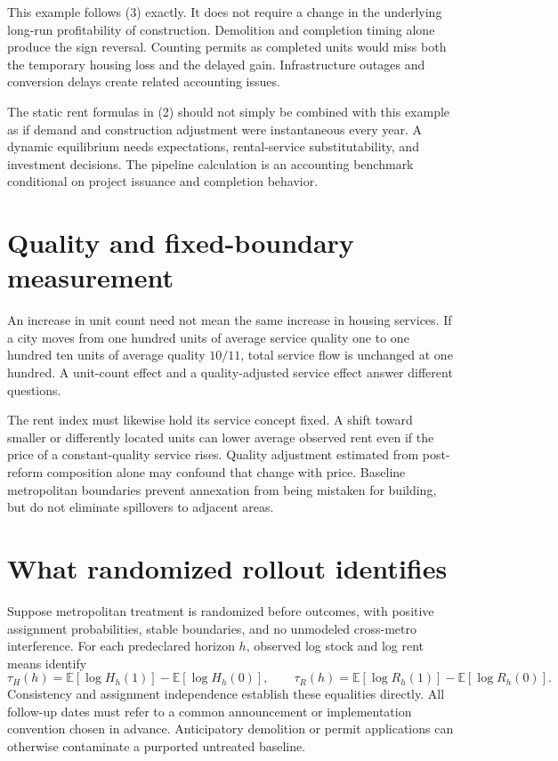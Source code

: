 \documentclass[11pt,a4paper]{article}
\newcommand{\E}{\mathbb E}
\begin{document}
This example follows (3) exactly. It does not require a change in the underlying long-run profitability of construction. Demolition and completion timing alone produce the sign reversal. Counting permits as completed units would miss both the temporary housing loss and the delayed gain. Infrastructure outages and conversion delays create related accounting issues.

The static rent formulas in (2) should not simply be combined with this example as if demand and construction adjustment were instantaneous every year. A dynamic equilibrium needs expectations, rental-service substitutability, and investment decisions. The pipeline calculation is an accounting benchmark conditional on project issuance and completion behavior.
\section{Quality and fixed-boundary measurement}
An increase in unit count need not mean the same increase in housing services. If a city moves from one hundred units of average service quality one to one hundred ten units of average quality $10/11$, total service flow is unchanged at one hundred. A unit-count effect and a quality-adjusted service effect answer different questions.

The rent index must likewise hold its service concept fixed. A shift toward smaller or differently located units can lower average observed rent even if the price of a constant-quality service rises. Quality adjustment estimated from post-reform composition alone may confound that change with price. Baseline metropolitan boundaries prevent annexation from being mistaken for building, but do not eliminate spillovers to adjacent areas.
\section{What randomized rollout identifies}
Suppose metropolitan treatment is randomized before outcomes, with positive assignment probabilities, stable boundaries, and no unmodeled cross-metro interference. For each predeclared horizon $h$, observed log stock and log rent means identify
\[
 \tau_H(h)=\E[\log H_h(1)]-\E[\log H_h(0)],\qquad
 \tau_R(h)=\E[\log R_h(1)]-\E[\log R_h(0)].
\]
Consistency and assignment independence establish these equalities directly. All follow-up dates must refer to a common announcement or implementation convention chosen in advance. Anticipatory demolition or permit applications can otherwise contaminate a purported untreated baseline.
\end{document}
